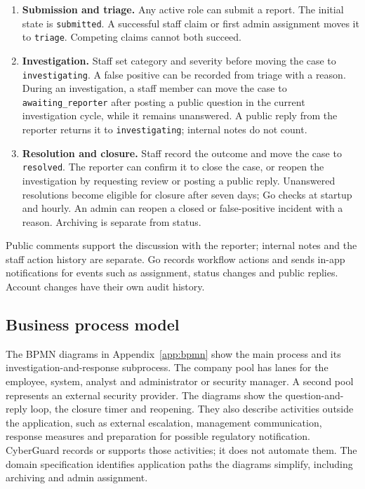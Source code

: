 \documentclass[11pt,a4paper]{article}
\newcommand{\code}[1]{\texttt{#1}}
\begin{document}
\begin{enumerate}
  \item \textbf{Submission and triage.} Any active role can submit a report.
    The initial state is \code{submitted}. A successful staff claim or
    first admin assignment moves it to \code{triage}. Competing claims cannot
    both succeed.
  \item \textbf{Investigation.} Staff set category and severity before moving
    the case to \code{investigating}. A false positive can be recorded from
    triage with a reason. During an investigation, a staff member can move
    the case to \code{awaiting\_reporter} after posting a public question
    in the current investigation cycle, while it remains unanswered.
    A public reply from the reporter returns it to
    \code{investigating}; internal notes do not count.
  \item \textbf{Resolution and closure.} Staff record the outcome and move the
    case to \code{resolved}. The reporter can confirm it to close the case,
    or reopen the investigation by requesting review or posting a public
    reply. Unanswered resolutions become eligible for closure after seven
    days; Go checks at startup and hourly. An admin can reopen a closed or
    false-positive incident with a reason. Archiving is separate from status.
\end{enumerate}

Public comments support the discussion with the reporter; internal notes and
the staff action history are separate. Go records workflow actions and sends
in-app notifications for events such as assignment, status changes and
public replies. Account changes have their own audit history.

\subsection{Business process model}

The BPMN diagrams in Appendix~\ref{app:bpmn} show the main process and its
investigation-and-response subprocess. The company pool has lanes for the
employee, system, analyst and administrator or security manager. A second
pool represents an external security provider.
The diagrams show the question-and-reply loop, the closure timer and reopening.
They also describe activities outside the application, such as external
escalation, management communication, response measures and preparation for
possible regulatory notification. CyberGuard records or supports those
activities; it does not automate them. The domain specification identifies
application paths the diagrams simplify, including archiving and admin
assignment.
\end{document}

